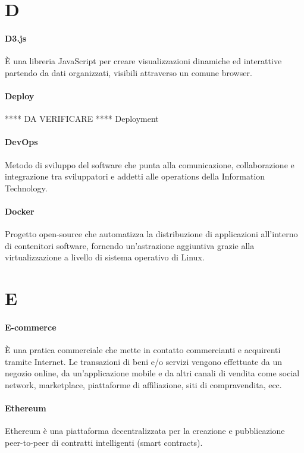\documentclass[]{article}
\begin{document}
	\newpage

	\section*{D}
	
	\paragraph*{D3.js}
	È una libreria JavaScript per creare visualizzazioni dinamiche ed interattive partendo da dati organizzati, visibili attraverso un comune browser.
	
	\paragraph*{Deploy} **** DA VERIFICARE **** Deployment
	
	\paragraph*{DevOps}
	Metodo di sviluppo del software che punta alla comunicazione, collaborazione e integrazione tra sviluppatori e addetti alle operations della Information Technology.
	
	\paragraph*{Docker}
	Progetto open-source che automatizza la distribuzione di applicazioni all'interno di contenitori software, fornendo un'astrazione aggiuntiva grazie alla virtualizzazione a livello di sistema operativo di Linux.
	
	\newpage
	
	\section*{E}
	
	\paragraph*{E-commerce}
	È una pratica commerciale che mette in contatto commercianti e acquirenti tramite Internet. Le transazioni di beni e/o servizi vengono effettuate da un negozio online, da un'applicazione mobile e da altri canali di vendita come social network, marketplace, piattaforme di affiliazione, siti di compravendita, ecc.
	
	\paragraph*{Ethereum}
	Ethereum è una piattaforma decentralizzata per la creazione e pubblicazione peer-to-peer di contratti intelligenti (smart contracts).
	
\end{document}
